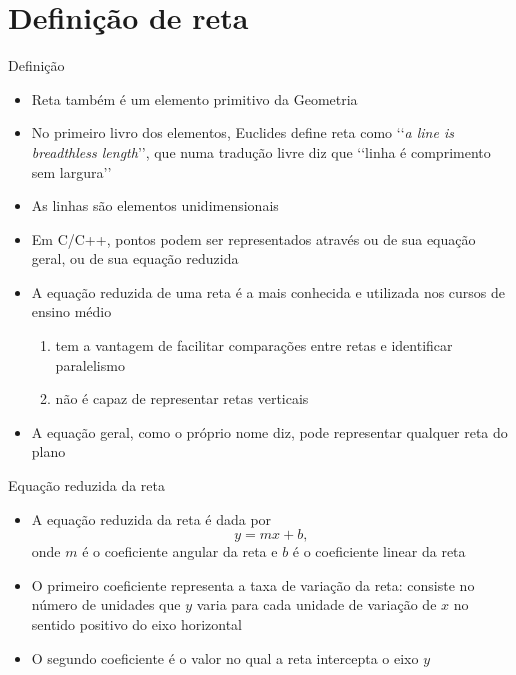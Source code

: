 \section{Definição de reta}

\begin{frame}[fragile]{Definição}

    \begin{itemize}
        \item Reta também é um elemento primitivo da Geometria

        \item No primeiro livro dos elementos, Euclides define reta como 
            \lq\lq \textit{a line is breadthless length}\rq\rq, que numa tradução livre 
            diz que \lq\lq linha é comprimento sem largura\rq\rq

        \item As linhas são elementos unidimensionais

        \item Em C/C++, pontos podem ser representados através ou de sua equação geral, ou de
            sua equação reduzida

        \item  A equação reduzida de uma reta é a mais conhecida e utilizada nos cursos de ensino médio
        \begin{enumerate}
            \item tem a vantagem de facilitar comparações entre retas e identificar paralelismo
            \item não é capaz de representar retas verticais
        \end{enumerate}

        \item A equação geral, como o próprio nome diz, pode representar qualquer reta do plano
   \end{itemize}

\end{frame}

\begin{frame}[fragile]{Equação reduzida da reta}

    \begin{itemize}
        \item A equação reduzida da reta é dada por
        \[
            y = mx + b,
        \]
        onde $m$ é o coeficiente angular da reta e $b$ é o coeficiente linear da reta

        \item O primeiro coeficiente representa a taxa de variação da reta: consiste no número de 
        unidades que $y$ varia para cada unidade de variação de $x$ no sentido positivo do eixo horizontal

        \item O segundo coeficiente é o valor no qual a reta intercepta o eixo $y$


    \end{itemize}

\end{frame}

